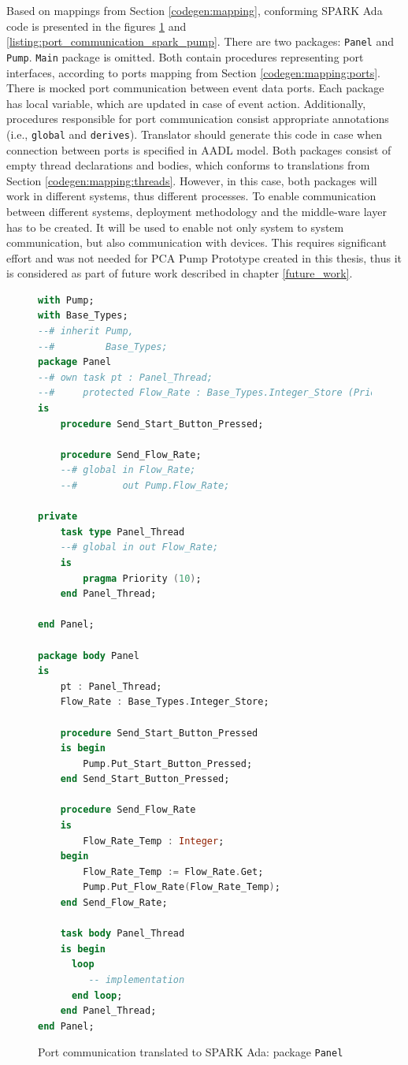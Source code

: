 Based on mappings from Section \ref{codegen:mapping}, conforming SPARK Ada code is presented in the figures \ref{listing:port_communication_spark_panel} and \ref{listing:port_communication_spark_pump}. There are two packages: \lstinline{Panel} and \lstinline{Pump}. \lstinline{Main} package is omitted. Both contain procedures representing port interfaces, according to ports mapping from Section \ref{codegen:mapping:ports}. There is mocked port communication between event data ports. Each package has local variable, which are updated in case of event action. Additionally, procedures responsible for port communication consist appropriate annotations (i.e., \lstinline{global} and \lstinline{derives}). Translator should generate this code in case when connection between ports is specified in AADL model. Both packages consist of empty thread declarations and bodies, which conforms to translations from Section \ref{codegen:mapping:threads}. However, in this case, both packages will work in different systems, thus different processes. To enable communication between different systems, deployment methodology and the middle-ware layer has to be created. It will be used to enable not only system to system communication, but also communication with devices. This requires significant effort and was not needed for PCA Pump Prototype created in this thesis, thus it is considered as part of future work described in chapter \ref{future_work}.

\begin{figure}[ht]
\singlespacing
\begin{lstlisting}[language=ada, frame=single, gobble=0]
with Pump;
with Base_Types;
--# inherit Pump,
--#         Base_Types;
package Panel
--# own task pt : Panel_Thread;
--#     protected Flow_Rate : Base_Types.Integer_Store (Priority => 10);
is
    procedure Send_Start_Button_Pressed;

    procedure Send_Flow_Rate;
    --# global in Flow_Rate;
    --#        out Pump.Flow_Rate;

private
    task type Panel_Thread
    --# global in out Flow_Rate;
    is
        pragma Priority (10);
    end Panel_Thread;

end Panel;

package body Panel
is
    pt : Panel_Thread;
    Flow_Rate : Base_Types.Integer_Store;

    procedure Send_Start_Button_Pressed
    is begin
        Pump.Put_Start_Button_Pressed;
    end Send_Start_Button_Pressed;

    procedure Send_Flow_Rate
    is
        Flow_Rate_Temp : Integer;
    begin
        Flow_Rate_Temp := Flow_Rate.Get;
        Pump.Put_Flow_Rate(Flow_Rate_Temp);
    end Send_Flow_Rate;

    task body Panel_Thread
    is begin
      loop
         -- implementation
      end loop;      
    end Panel_Thread;
end Panel;
\end{lstlisting} 
\doublespacing
\caption{Port communication translated to SPARK Ada: package \lstinline{Panel}}
\label{listing:port_communication_spark_panel}
\end{figure}

